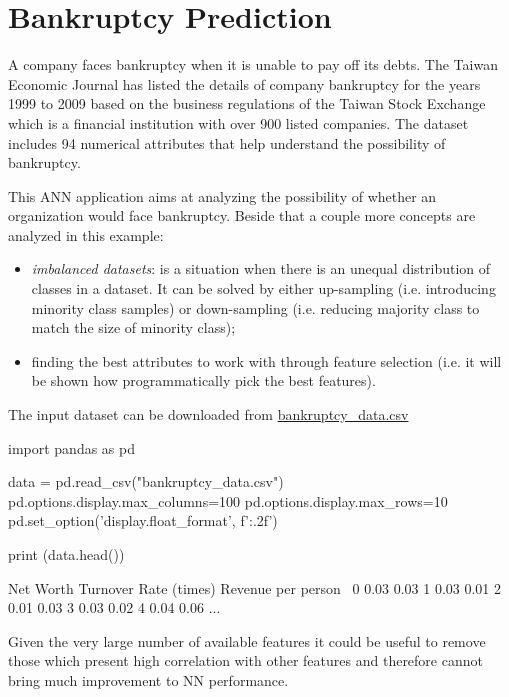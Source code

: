 \section{Bankruptcy Prediction}
A company faces bankruptcy when it is unable to pay off its debts. The Taiwan Economic Journal has listed the details of company bankruptcy for the years 1999 to 2009 based on the business regulations of the Taiwan Stock Exchange which is a financial institution with over 900 listed companies. The dataset includes 94 numerical attributes that help understand the possibility of bankruptcy.

This ANN application aims at analyzing the possibility of whether an organization would face bankruptcy. Beside that a couple more concepts are analyzed in this example:
\begin{itemize}
\item \emph{imbalanced datasets}: is a situation when there is an unequal distribution of classes in a dataset. It can be solved by either up-sampling (i.e. introducing minority class samples) or down-sampling (i.e. reducing majority class to match the size of minority class);
\item finding the best attributes to work with through feature selection (i.e. it will be shown how programmatically pick the best features).
\end{itemize}

The input dataset can be downloaded from \href{https://raw.githubusercontent.com/matteosan1/finance_course/refs/heads/develop/input_files/bankruptcy.csv}{bankruptcy\_data.csv}
\begin{ipython}
import pandas as pd
	
data = pd.read_csv("bankruptcy_data.csv")
pd.options.display.max_columns=100
pd.options.display.max_rows=10
pd.set_option('display.float_format', f'{:.2f}')
	
print (data.head())
\end{ipython}
\begin{ioutput}
Net Worth Turnover Rate (times)  Revenue per person  \
0                          0.03                0.03   
1                          0.03                0.01   
2                          0.01                0.03   
3                          0.03                0.02   
4                          0.04                0.06   
...                        
\end{ioutput}

Given the very large number of available features it could be useful to remove those which present high correlation with other features and therefore cannot bring much improvement to NN performance.

